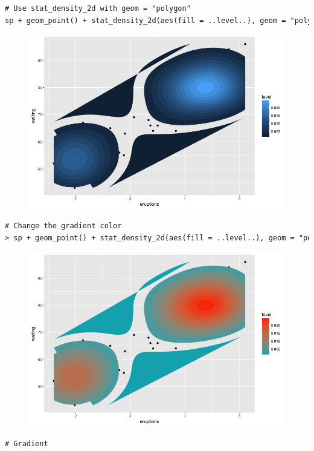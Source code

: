 \begin{lstlisting}[language=html]
# Use stat_density_2d with geom = "polygon"
sp + geom_point() + stat_density_2d(aes(fill = ..level..), geom = "polygon")
\end{lstlisting}
\begin{figure}[H]\begin{center}\includegraphics[scale=1 ]{ilu/bg67.png}\end{center}\end{figure}
\begin{lstlisting}[language=html]
# Change the gradient color
> sp + geom_point() + stat_density_2d(aes(fill = ..level..), geom = "polygon") + scale_fill_gradient(low = "#00AFBB", high = "#FC3E07")
\end{lstlisting}
\begin{figure}[H]\begin{center}\includegraphics[scale=1 ]{ilu/bg68.png}\end{center}\end{figure}
\begin{lstlisting}[language=html]
# Gradient
\end{lstlisting}
